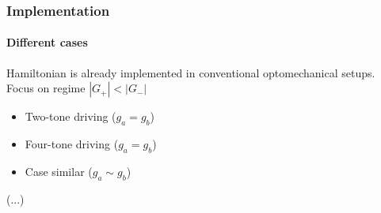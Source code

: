 \documentclass[aspectratio=43]{beamer}
\begin{document}
\begin{frame}

	\frametitle{Implementation}
	\framesubtitle{Different cases}
	
	Hamiltonian is already implemented in conventional optomechanical setups. Focus on regime $|G_{+}|<|G_{-}|$
	
	\begin{itemize}
		\item Two-tone driving ($g_{a} = g_{b}$)
		\item Four-tone driving ($g_{a} = g_{b}$)
		\item Case similar ($g_{a} \sim g_{b}$)
	\end{itemize}	
	
	(...)

\end{frame}
\end{document}
